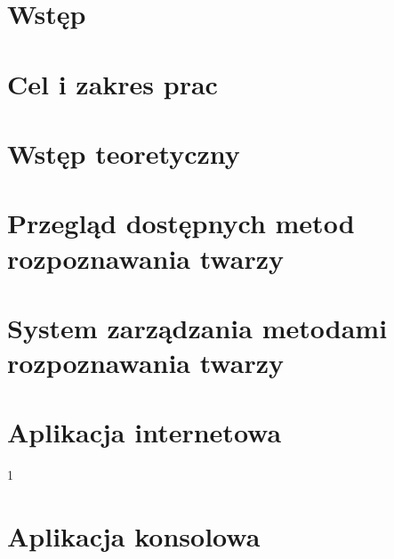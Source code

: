 \documentclass[11pt, a4paper,polish,twoside]{report}
\begin{document}



\newpage
\null
\thispagestyle{empty}
\newpage
%



\tableofcontents

\chapter{Wstęp}


\chapter{Cel i zakres prac}


\chapter{Wstęp teoretyczny}


\chapter{Przegląd dostępnych metod rozpoznawania twarzy}


\chapter{System zarządzania metodami rozpoznawania twarzy}


\chapter{Aplikacja internetowa}


1\chapter{Aplikacja konsolowa}

\end{document}
